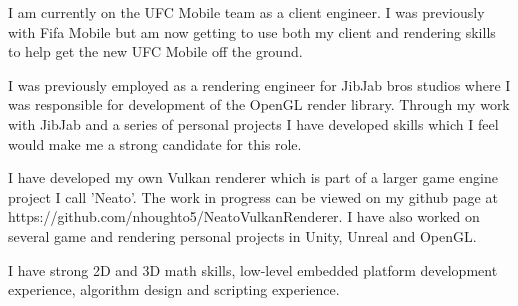 I am currently on the UFC Mobile team as a client engineer. I was previously with Fifa Mobile but am now getting to use both my client and rendering skills to help get the new UFC Mobile off the ground.

I was previously employed as a rendering engineer for JibJab bros studios where I was responsible for development of the OpenGL render library.
Through my work with JibJab and a series of personal projects I have developed skills which I feel would make me a strong candidate for this role.

I have developed my own Vulkan renderer which is part of a larger game engine project I call 'Neato'. The work in progress can be viewed on my github page at https://github.com/nhoughto5/NeatoVulkanRenderer.
I have also worked on several game and rendering personal projects in Unity, Unreal and OpenGL.

I have strong 2D and 3D math skills, low-level embedded platform development experience, algorithm design and scripting experience.